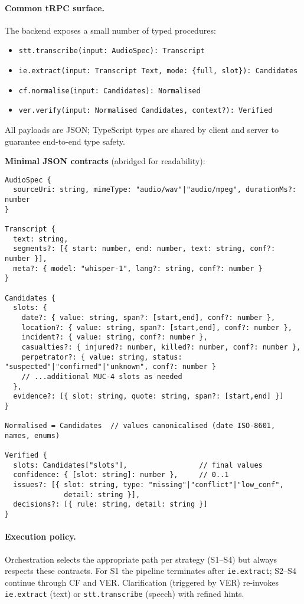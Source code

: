 \paragraph{Common tRPC surface.}
The backend exposes a small number of typed procedures:
\begin{itemize}
  \item \texttt{stt.transcribe(input: AudioSpec): Transcript}
  \item \texttt{ie.extract(input: Transcript \textbar{} Text, mode: \{full, slot\}): Candidates}
  \item \texttt{cf.normalise(input: Candidates): Normalised}
  \item \texttt{ver.verify(input: Normalised \textbar{} Candidates, context?): Verified}
\end{itemize}
All payloads are JSON; TypeScript types are shared by client and server to guarantee end-to-end type safety.

\medskip
\noindent\textbf{Minimal JSON contracts} (abridged for readability):

\begin{verbatim}
AudioSpec {
  sourceUri: string, mimeType: "audio/wav"|"audio/mpeg", durationMs?: number
}

Transcript {
  text: string,
  segments?: [{ start: number, end: number, text: string, conf?: number }],
  meta?: { model: "whisper-1", lang?: string, conf?: number }
}

Candidates {
  slots: {
    date?: { value: string, span?: [start,end], conf?: number },
    location?: { value: string, span?: [start,end], conf?: number },
    incident?: { value: string, conf?: number },
    casualties?: { injured?: number, killed?: number, conf?: number },
    perpetrator?: { value: string, status: "suspected"|"confirmed"|"unknown", conf?: number }
    // ...additional MUC-4 slots as needed
  },
  evidence?: [{ slot: string, quote: string, span?: [start,end] }]
}

Normalised = Candidates  // values canonicalised (date ISO-8601, names, enums)

Verified {
  slots: Candidates["slots"],                 // final values
  confidence: { [slot: string]: number },     // 0..1
  issues?: [{ slot: string, type: "missing"|"conflict"|"low_conf",
              detail: string }],
  decisions?: [{ rule: string, detail: string }]
}
\end{verbatim}

\paragraph{Execution policy.} Orchestration selects the appropriate path per strategy (S1--S4) but always respects these contracts. For S1 the pipeline terminates after \texttt{ie.extract}; S2--S4 continue through CF and VER. Clarification (triggered by VER) re-invokes \texttt{ie.extract} (text) or \texttt{stt.transcribe} (speech) with refined hints.

